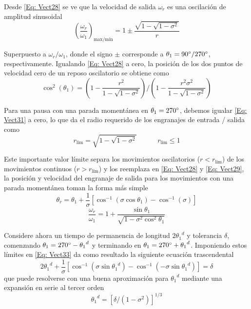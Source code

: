 \documentclass[12pt, final]{extarticle}
\begin{document}
Desde \eqref{Eq: Vect28} se ve que la velocidad de salida $\omega_r$ es una
oscilación de amplitud sinusoidal
\begin{equation}
   (\frac{\omega_r}{\omega_1})_{\text{max/min}}=1 \pm \frac{\sqrt{1-\sqrt{1-{\sigma}^2}}}{r}
   \label{Eq: Vect30}
\end{equation}

Superpuesto a $\omega_r / \omega_1$, donde el signo $\pm$ corresponde a
$\theta_1= 90\degree / 270\degree$, respectivamente. Igualando \eqref{Eq:
Vect28} a cero, la posición de los dos puntos de velocidad cero de un reposo
oscilatorio se obtiene como
\begin{equation}
   \cos^{2}{(\theta_1)}=(1-\frac{{r}^2}{1-\sqrt{1-{\sigma}^2}})/(1-\frac{{r}^2{\sigma}^2}{1-\sqrt{1-{\sigma}^2}})
   \label{Eq: Vect31}
\end{equation}

Para una pausa con una parada momentánea en $\theta_1= 270\degree$, debemos
igualar \eqref{Eq: Vect31} a cero, lo que da el radio requerido de los
engranajes de entrada / salida como
\begin{equation}
   r_{\text{lim}}=\sqrt{1-\sqrt{1-{\sigma}^2}} \quad\quad\quad  r_{\text{lim}} \leq 1
   \label{Eq: Vect32}
\end{equation}

Este importante valor límite separa los movimientos oscilatorios ($r <
r_{\text{lim}}$) de los movimientos continuos ($r > r_{\text{lim}}$) y los
reemplaza en \eqref{Eq: Vect28} y \eqref{Eq: Vect29}, la posición y velocidad
del engranaje de salida para los movimientos con una parada momentánea toman la
forma más simple
\begin{equation}
   \theta_r=\theta_1+\frac{1}{\sigma}[\cos^{-1}{(\sigma\cos{\theta_1})}-\cos^{-1}{(\sigma)}]
   \label{Eq: Vect33}
\end{equation}
\begin{equation}
   \frac{\omega_r}{\omega_1}=1+\frac{\sin{\theta_1}}{\sqrt{1-{\sigma}^2\cos^{2}{\theta_1}}}
   \label{Eq: Vect34}
\end{equation}

Considere ahora un tiempo de permanencia de longitud $2{\theta_1}^d$ y
tolerancia $\delta$, comenzando $\theta_1=270\degree-{\theta_1}^d$ y terminando
en $\theta_1=270\degree+{\theta_1}^d$. Imponiendo estos límites en \eqref{Eq:
Vect33} da como resultado la siguiente ecuación trascendental
\begin{equation}
   2{\theta_1}^d + \frac{1}{\sigma}[\cos^{-1}{(\sigma\sin{{\theta_1}^d})} - \cos^{-1}{(-\sigma\sin{{\theta_1}^d})}]= \delta
   \label{Eq: Vect35}
\end{equation}
que puede resolverse con una buena aproximación para ${\theta_1}^d$ mediante una
expansión en serie al tercer orden
\begin{equation}
   {\theta_1}^d=[\delta/(1-{\sigma}^2)]^{1/3}
   \label{Eq: Vect36}
\end{equation}
\end{document}

